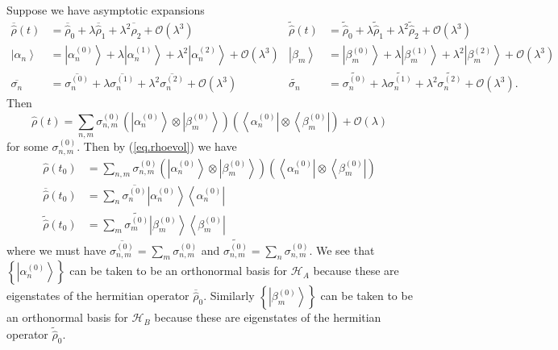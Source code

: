 \documentclass[11pt]{article}
\newcommand{\Od}[1]{\mathcal{O}{\left(#1\right)}}
\newcommand{\bra}[1]{\left\langle#1\right|}
\newcommand{\ket}[1]{\left|#1\right\rangle}
\newcommand{\hilb}{\mathcal{H}}
\newcommand{\op}[1]{\hat{#1}}
\theoremstyle{theorem}
\theoremstyle{remark}
\theoremstyle{step}
\theoremstyle{gap}
\begin{document}
Suppose we have asymptotic expansions
\begin{align*}
\overline{\op{\rho}}(t) &= \overline{\op{\rho}}_0 + \lambda \overline{\op{\rho}}_1 + \lambda^2 \overline{\op{\rho}}_2 + \Od{\lambda^3} &
\widetilde{\op{\rho}}(t) &= \widetilde{\op{\rho}}_0 + \lambda \widetilde{\op{\rho}}_1 + \lambda^2 \widetilde{\op{\rho}}_2 + \Od{\lambda^3} \\
\ket{\alpha_n} &= \ket{\alpha_n^{(0)}} + \lambda \ket{\alpha_n^{(1)}} + \lambda^2 \ket{\alpha_n^{(2)}} + \Od{\lambda^3} &
\ket{\beta_m} &= \ket{\beta_m^{(0)}} + \lambda \ket{\beta_m^{(1)}} + \lambda^2 \ket{\beta_m^{(2)}} + \Od{\lambda^3} \\
\overline{\sigma_n} &= \overline{\sigma_n^{(0)}} + \lambda \overline{\sigma_n^{(1)}} + \lambda^2 \overline{\sigma_n^{(2)}} + \Od{\lambda^3} &
\widetilde{\sigma_n} &= \widetilde{\sigma_n^{(0)}} + \lambda \widetilde{\sigma_n^{(1)}} + \lambda^2 \widetilde{\sigma_n^{(2)}} + \Od{\lambda^3}.
\end{align*}
Then
\[
\op{\rho}(t) = \sum_{n,m} \sigma_{n,m}^{(0)} \left(\ket{\alpha_n^{(0)}}\otimes\ket{\beta_m^{(0)}}\right) \left(\bra{\alpha_n^{(0)}}\otimes\bra{\beta_m^{(0)}}\right) + \Od{\lambda}
\]
for some \(\sigma_{n,m}^{(0)}\). Then by (\ref{eq.rhoevol}) we have
\begin{align*}
\op{\rho}\left(t_0\right) &= \sum_{n,m} \sigma_{n,m}^{(0)} \left(\ket{\alpha_n^{(0)}}\otimes\ket{\beta_m^{(0)}}\right) \left(\bra{\alpha_n^{(0)}}\otimes\bra{\beta_m^{(0)}}\right) \\
\overline{\op{\rho}}\left(t_0\right) &= \sum_{n} \overline{\sigma_{n}^{(0)}}\ket{\alpha_n^{(0)}}\bra{\alpha_n^{(0)}} \\
\widetilde{\op{\rho}}\left(t_0\right) &= \sum_{m} \widetilde{\sigma_{m}^{(0)}}\ket{\beta_m^{(0)}}\bra{\beta_m^{(0)}}
\end{align*}
where we must have \(\overline{\sigma_{n,m}^{(0)}} = \sum_m \sigma_{n,m}^{(0)}\) and \(\widetilde{\sigma_{n,m}^{(0)}} = \sum_n \sigma_{n,m}^{(0)}\).
We see that \(\left\{\ket{\alpha_n^{(0)}}\right\}\) can be taken to be an orthonormal basis for \(\hilb_A\) because these are eigenstates of the hermitian operator \(\overline{\op{\rho}}_0\). Similarly \(\left\{\ket{\beta_m^{(0)}}\right\}\) can be taken to be an orthonormal basis for \(\hilb_B\) because these are eigenstates of the hermitian operator \(\widetilde{\op{\rho}}_0\).
\end{document}
